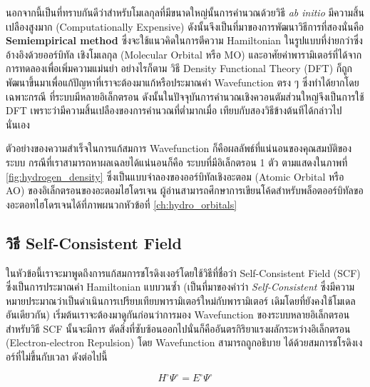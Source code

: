 นอกจากนี้เป็นที่ทราบกันดีว่าสำหรับโมเลกุลที่มีขนาดใหญ่นั้นการคำนวณด้วยวิธี \textit{ab initio} มีความสิ้นเปลืองสูงมาก (Computationally 
Expensive)\autocite{grabowski2011} ดังนั้นจึงเป็นที่มาของการพัฒนาวิธีการที่สองนั่นคือ \textbf{Semiempirical method}%
\autocite{thiel2014,christensen2016,kriz2020} ซึ่งจะใช้แนวคิดในการตีความ Hamiltonian ในรูปแบบที่ง่ายกว่าซึ่งอ้างอิงด้วยออร์บิทัล%
เชิงโมเลกุล (Molecular Orbital หรือ MO) และอาศัยค่าพารามิเตอร์ที่ได้จากการทดลองเพื่อเพิ่มความแม่นยำ อย่างไรก็ตาม วิธี Density 
Functional Theory (DFT) ก็ถูกพัฒนาขึ้นมาเพื่อแก้ปัญหาที่เราจะต้องมาแก้หรือประมาณค่า Wavefunction ตรง ๆ ซึ่งทำได้ยากโดยเฉพาะกรณี%
ที่ระบบมีหลายอิเล็กตรอน ดังนั้นในปัจจุบันการคำนวณเชิงควอนตัมส่วนใหญ่จึงเป็นการใช้ DFT เพราะว่ามีความสิ้นเปลืองของการคำนวณที่ต่ำมากเมื่อ%
เทียบกับสองวิธีข้างต้นทีได้กล่าวไปนั่นเอง

ตัวอย่างของความสำเร็จในการแก้สมการ Wavefunction ก็คือผลลัพธ์ที่แน่นอนของคุณสมบัติของระบบ กรณีที่เราสามารถหาผลเฉลยได้แน่นอนก็คือ%
ระบบที่มีอิเล็กตรอน 1 ตัว ตามแสดงในภาพที่ \ref{fig:hydrogen_density} ซึ่งเป็นแบบจำลองของออร์บิทัลเชิงอะตอม (Atomic Orbital 
หรือ AO) ของอิเล็กตรอนของอะตอมไฮโดรเจน ผู้อ่านสามารถศึกษาการเขียนโค้ดสำหรับพล็อตออร์บิทัลของอะตอทไฮโดรเจนได้ที่ภาพผนวกหัวข้อที่ 
\ref{ch:hydro_orbitals}

\subsection{วิธี Self-Consistent Field}
\label{ssec:scf}

ในหัวข้อนี้เราจะมาพูดถึงการแก้สมการชโรดิงเงอร์โดยใช้วิธีที่ชื่อว่า Self-Consistent Field (SCF) ซึ่งเป็นการประมาณค่า Hamiltonian 
แบบวนซ้ำ (เป็นที่มาของคำว่า \textit{Self-Consistent} ซึ่งมีความหมายประมาณว่าเป็นดำเนินการเปรียบเทียบพารามิเตอร์ใหม่กับพารามิเตอร์%
เดิมโดยที่ยังคงใช้โมเดลอันเดียวกัน) เริ่มต้นเราจะต้องมาดูกันก่อนว่าการมอง Wavefunction ของระบบหลายอิเล็กตรอนสำหรับวิธี SCF นั้นจะมีการ%
ตัดสิ่งที่ซับซ้อนออกไปนั่นก็คืออันตรกิริยาแรงผลักระหว่างอิเล็กตรอน (Electron-electron Repulsion) โดย Wavefunction สามารถถูกอธิบาย%
ได้ด้วยสมการชโรดิงเงอร์ที่ไม่ขึ้นกับเวลา ดังต่อไปนี้\autocite{cramer2004}

\begin{equation}\label{eq:tise_elec}
    H^{\circ} \Psi^{\circ} = E^{\circ} \Psi^{\circ}
\end{equation}

